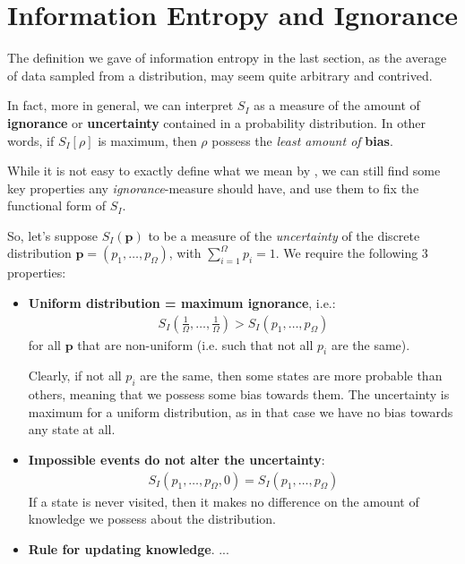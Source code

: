 \documentclass[../template.tex]{subfiles}
\begin{document}

\section{Information Entropy and Ignorance}
The definition we gave of information entropy in the last section, as the average  of data sampled from a distribution, may seem quite arbitrary and contrived.

\medskip

In fact, more in general, we can interpret $S_I$ as a measure of the amount of \textbf{ignorance} or \textbf{uncertainty} contained in a probability distribution. In other words, if $S_I[\rho]$ is maximum, then $\rho$ possess the \textit{least amount of} \textbf{bias}.  

While it is not easy to exactly define what we mean by , we can still find some key properties any \textit{ignorance}-measure should have, and use them to fix the functional form of $S_I$.

\medskip

So, let's suppose $S_I(\bm{p})$ to be a measure of the \textit{uncertainty} of the discrete distribution $\bm{p} = (p_1, \dots, p_\Omega)$, with $\sum_{i=1}^{\Omega} p_i = 1$. We require the following $3$ properties:
\begin{itemize}
    \item \textbf{Uniform distribution = maximum ignorance}, i.e.:
    \begin{align} \label{eqn:key1}
        \displaystyle S_I \left(\frac{1}{\Omega}, \dots, \frac{1}{\Omega}  \right) > S_I (p_1, \dots, p_{\Omega})
    \end{align}
     for all $\bm{p}$ that are non-uniform (i.e. such that not all $p_i$ are the same).  

    \medskip

    Clearly, if not all $p_i$ are the same, then some states are more probable than others, meaning that we possess some bias towards them. The uncertainty is maximum for a uniform distribution, as in that case we have no bias towards any state at all.

    \item \textbf{Impossible events do not alter the uncertainty}:
    \begin{align*}
        S_I(p_1, \dots, p_{\Omega},0) = S_I(p_1, \dots, p_{\Omega})
    \end{align*} 
    If a state is never visited, then it makes no difference on the amount of knowledge we possess about the distribution.

    \item \textbf{Rule for updating knowledge}. ... 
\end{itemize}
\end{document}
